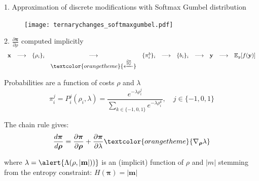 \documentclass[10pt,aspectratio=169]{beamer}
\begin{document}
\begin{frame}{1. Approximation of discrete modifications with Softmax Gumbel distribution}
    \begin{figure}[h]
        \texttt{[image: ternarychanges\_softmaxgumbel.pdf]}
    \end{figure}
\end{frame}



\begin{frame}{2. $\frac{\partial \mathbf{\pi}}{\partial \rho}$ computed implicitly}
    \begin{equation*}
        \begin{array}{ccccccccccc}
            \mathbf{x} & \longrightarrow & \{\rho_i\}_i & \longrightarrow & \{\pi_i^b\}_i & \longrightarrow &  \{b_i\}_i  & \longrightarrow  & \mathbf{y} & \longrightarrow  & \mathbb{E}_{y} [f(\mathbf{y})] \\ 
            &&& \textcolor{orangetheme}{\xleftarrow{\frac{\partial \pi}{\partial \rho} }}
        \end{array}
    \end{equation*}

    \pause
    Probabilities are a function of costs $\rho$ and $\lambda$
    \begin{equation}
        \pi_i^j = P_i^j\left(\rho_{i}, \lambda\right) =\frac{e^{-\lambda \rho_{i}^{j}}}{\sum_{k \in \{-1,0,1\}} e^{-\lambda \rho_{i}^{k}}}, \quad j \in \{-1, 0, 1\}
    \end{equation}


    The chain rule gives:
    \begin{equation}
        \frac{d \bm{\pi}}{d \bm{\rho}} = \frac{\partial \bm{\pi}}{\partial \bm{\rho}} + \frac{\partial \bm{\pi}}{\partial \lambda} \textcolor{orangetheme}{\nabla_{\bm{\rho}} \lambda}
        \label{eq:gradientprobabilities}
    \end{equation}

    where $\lambda = \alert{\Lambda(\rho,|\mathbf{m}|))}$ is an (implicit) function of $\rho$ and $|m|$ stemming from the entropy constraint: 
    $ H(\boldsymbol{\pi})=|\mathbf{m}|$
   

\end{frame}
\end{document}
